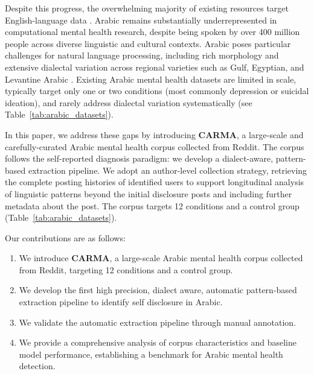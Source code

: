 \documentclass[11pt]{article}
\begin{document}
Despite this progress, the overwhelming majority of existing resources target English-language data \cite{harrigian2021state}. Arabic remains substantially underrepresented in computational mental health research, despite being spoken by over 400 million people across diverse linguistic and cultural contexts. Arabic poses particular challenges for natural language processing, including rich morphology and extensive dialectal variation across regional varieties such as Gulf, Egyptian, and Levantine Arabic \cite{darwish2021panorama,habash2010introduction}. Existing Arabic mental health datasets are limited in scale, typically target only one or two conditions (most commonly depression or suicidal ideation), and rarely address dialectal variation systematically (see Table~\ref{tab:arabic_datasets}).

In this paper, we address these gaps by introducing \textbf{CARMA}, a large-scale and carefully-curated Arabic mental
health corpus collected from Reddit. The corpus follows the self-reported
diagnosis paradigm: we develop a dialect-aware, pattern-based extraction pipeline. We adopt an author-level collection strategy, retrieving the complete posting histories of
identified users to support longitudinal analysis of linguistic patterns beyond the initial disclosure posts and including further metadata about the post. The corpus targets 12 conditions and a control group (Table~\ref{tab:arabic_datasets}).


Our contributions are as follows:
\begin{enumerate}
    \item We introduce \textbf{CARMA}, a large-scale Arabic mental health corpus
    collected from Reddit, targeting 12 conditions and a control group.
 
    \item We develop the first high precision, dialect aware, automatic pattern-based extraction pipeline to identify self disclosure in Arabic.

    \item We validate the automatic extraction pipeline through manual annotation.
    
    \item We provide a comprehensive analysis of corpus characteristics and
    baseline model performance, establishing a benchmark for Arabic mental health detection.

\end{enumerate}
\end{document}
